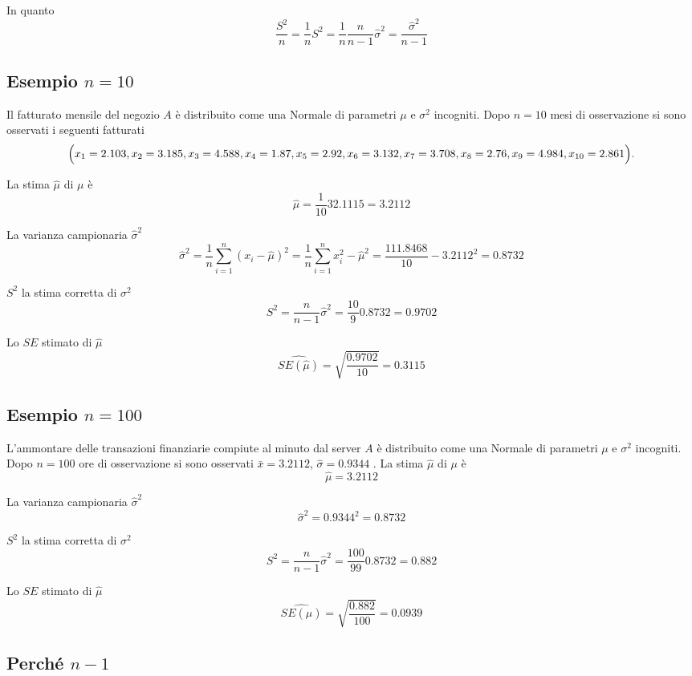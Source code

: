 \documentclass[
  11pt,
]{book}
\theoremstyle{mytheoremstyle}
\theoremstyle{mydefstyle}
\begin{document}
In quanto
\[\frac {S^2}{n}=\frac 1 nS^2=\frac 1 n \frac{n}{n-1}\hat\sigma^2=\frac{\hat\sigma^2}{n-1}\]

\subsection{\texorpdfstring{Esempio \(n=10\)}{Esempio n=10}}\label{esempio-n10}

Il fatturato mensile del negozio \(A\) è distribuito come una Normale di parametri \(\mu\) e \(\sigma^2\) incogniti. Dopo \(n=10\) mesi di osservazione si sono osservati i seguenti fatturati
\[
 \Big(x_{1}=2.103, x_{2}=3.185, x_{3}=4.588, x_{4}=1.87, x_{5}=2.92,\\x_{6}=3.132, x_{7}=3.708, x_{8}=2.76, x_{9}=4.984, x_{10}=2.861\Big).
\]

La stima \(\hat\mu\) di \(\mu\) è
\[
\hat\mu=\frac 1 {10}32.1115=3.2112
\]

La varianza campionaria \(\hat\sigma^2\)
\[\hat\sigma^2=\frac 1 n \sum_{i=1}^n(x_i-\hat\mu)^2=\frac 1 n \sum_{i=1}^n x_i^2-\hat\mu^2=\frac{111.8468}{10}-3.2112^2=0.8732\]

\(S^2\) la stima corretta di \(\sigma^2\)
\[S^2=\frac{n}{n-1}\hat\sigma^2=\frac{10}{9}0.8732=0.9702\]

Lo \(SE\) stimato di \(\hat\mu\)
\[\widehat{SE(\hat\mu)} = 
  \sqrt{\frac{0.9702}{10}} =
  0.3115\]

\subsection{\texorpdfstring{Esempio \(n=100\)}{Esempio n=100}}\label{esempio-n100}

L'ammontare delle transazioni finanziarie compiute al minuto dal server \(A\) è distribuito come una Normale di parametri \(\mu\) e \(\sigma^2\) incogniti. Dopo \(n=100\) ore di osservazione si sono osservati \(\bar x=3.2112\), \(\hat\sigma=0.9344\) .
La stima \(\hat\mu\) di \(\mu\) è
\[\hat\mu=3.2112\]

La varianza campionaria \(\hat\sigma^2\)
\[\hat\sigma^2=0.9344^2=0.8732\]

\(S^2\) la stima corretta di \(\sigma^2\)
\[S^2=\frac{n}{n-1}\hat\sigma^2=\frac{100}{99}0.8732=0.882\]

Lo \(SE\) stimato di \(\hat\mu\)
\[\widehat{SE(\hat\mu)} = 
  \sqrt{\frac{0.882}{100}} =
  0.0939\]

\subsection{\texorpdfstring{Perché \(n-1\)}{Perché n-1}}\label{perchuxe9-n-1}
\end{document}
